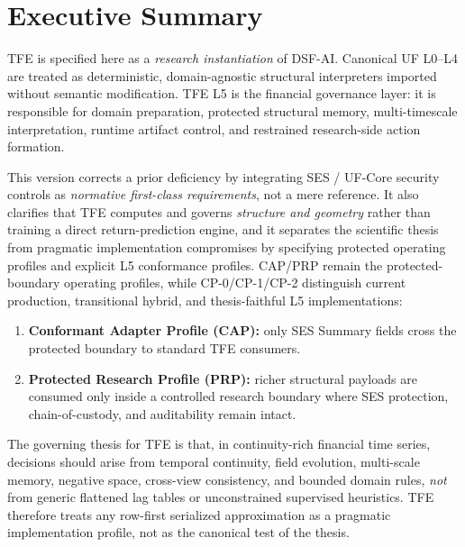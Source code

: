 \documentclass[11pt]{report}
\begin{document}
\tableofcontents
\clearpage

\chapter*{Executive Summary}
TFE is specified here as a \emph{research instantiation} of DSF-AI. Canonical UF L0--L4 are treated as deterministic, domain-agnostic structural interpreters imported without semantic modification. TFE L5 is the financial governance layer: it is responsible for domain preparation, protected structural memory, multi-timescale interpretation, runtime artifact control, and restrained research-side action formation.

This version corrects a prior deficiency by integrating SES / UF-Core security controls as \emph{normative first-class requirements}, not a mere reference. It also clarifies that TFE computes and governs \emph{structure and geometry} rather than training a direct return-prediction engine, and it separates the scientific thesis from pragmatic implementation compromises by specifying protected operating profiles and explicit L5 conformance profiles. CAP/PRP remain the protected-boundary operating profiles, while CP-0/CP-1/CP-2 distinguish current production, transitional hybrid, and thesis-faithful L5 implementations:
\begin{enumerate}[leftmargin=1.2cm]
    \item \textbf{Conformant Adapter Profile (CAP):} only SES Summary fields cross the protected boundary to standard TFE consumers.
    \item \textbf{Protected Research Profile (PRP):} richer structural payloads are consumed only inside a controlled research boundary where SES protection, chain-of-custody, and auditability remain intact.
\end{enumerate}

The governing thesis for TFE is that, in continuity-rich financial time series, decisions should arise from temporal continuity, field evolution, multi-scale memory, negative space, cross-view consistency, and bounded domain rules, \emph{not} from generic flattened lag tables or unconstrained supervised heuristics. TFE therefore treats any row-first serialized approximation as a pragmatic implementation profile, not as the canonical test of the thesis.
\end{document}
